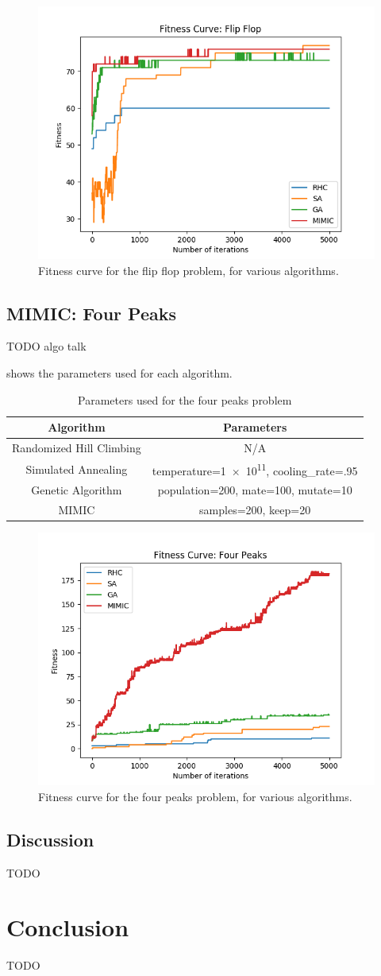 \documentclass{article}
\begin{document}

      \begin{figure}[htb]
      \centering
      \includegraphics[width=.5\linewidth]{out/op/flipflop/fitness.png}
      \caption{Fitness curve for the flip flop problem, for various algorithms.}
      \label{fig:fitness-ff}
      \end{figure}

    \subsection{MIMIC: Four Peaks}
      TODO algo talk

       shows the parameters used for each algorithm.

      \begin{table}[h!]
      \centering
        \begin{tabular}{||c|c||}\hline
          \textbf{Algorithm} & \textbf{Parameters} \\ \hline
          Randomized Hill Climbing & N/A \\ \hline
          Simulated Annealing & temperature=\num{1e11}, cooling\_rate=.95 \\ \hline
          Genetic Algorithm & population=200, mate=100, mutate=10 \\ \hline
          MIMIC & samples=200, keep=20 \\ \hline
        \end{tabular}

        \caption{Parameters used for the four peaks problem}
        \label{tab:fp-params}
      \end{table}


      \begin{figure}[htb]
      \centering
      \includegraphics[width=.5\linewidth]{out/op/fourpeaks/fitness.png}
      \caption{Fitness curve for the four peaks problem, for various algorithms.}
      \label{fig:fitness-fp}
      \end{figure}

    \subsection{Discussion}
      TODO

  \section{Conclusion}
    TODO
\end{document}
